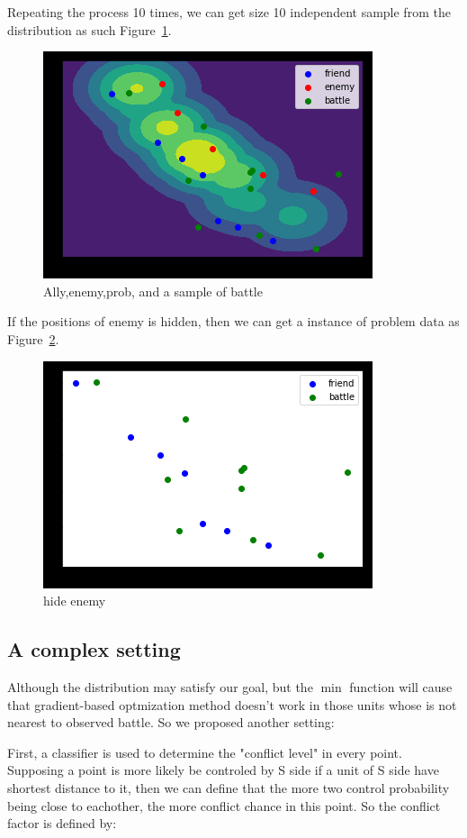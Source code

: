 \documentclass{article}
\begin{document}
Repeating the process 10 times, we can get size 10 independent sample from the distribution as such Figure~\ref{fig:stateSampleBattle}.

\begin{figure}[h!]
\includegraphics[width=0.6\linewidth]{state_sample_battle.png}
\caption{Ally,enemy,prob, and a sample of battle}
\label{fig:stateSampleBattle}
\end{figure}

If the positions of enemy is hidden, then we can get a instance of problem data as Figure~\ref{fig:stateNoEnemy}.

\begin{figure}[h!]
\includegraphics[width=0.6\linewidth]{state_no_enemy.png}
\caption{hide enemy}
\label{fig:stateNoEnemy}
\end{figure}

\subsection{A complex setting}

Although the distribution may satisfy our goal, but the $\min$ function will cause that gradient-based optmization
method doesn't work in those units whose is not nearest to observed battle. So we proposed another setting:

First, a classifier is used to determine the "conflict level" in every point.
Supposing a point is more likely be controled by S side 
if a unit of S side have shortest distance to it, then we can define that the more two control probability 
being close to eachother, the more conflict chance in this point. So the conflict factor is defined by:
\end{document}
